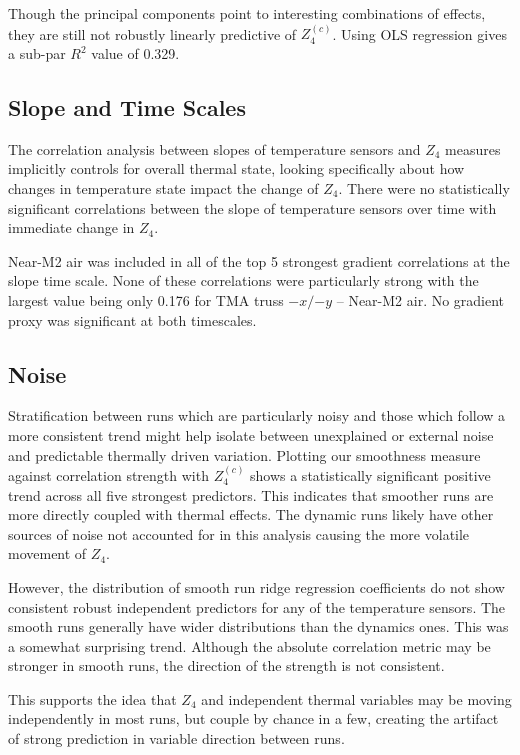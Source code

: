 \documentclass[SE,authoryear,toc]{lsstdoc}
\begin{document}
Though the principal components point to interesting combinations of effects, they are still not robustly linearly predictive of $Z_4^{(c)}$. Using OLS regression gives a sub-par $R^2$ value of 0.329.

\subsection{Slope and Time Scales}

The correlation analysis between slopes of temperature sensors and $Z_4$ measures implicitly controls for overall thermal state, looking specifically about how changes in temperature state impact the change of $Z_4$. There were no statistically significant correlations between the slope of temperature sensors over time with immediate change in $Z_4$.

Near-M2 air was included in all of the top 5 strongest gradient correlations at the slope time scale. None of these correlations were particularly strong with the largest value being only 0.176 for TMA truss $-x/{-y}$ -- Near-M2 air. No gradient proxy was significant at both timescales.

\subsection{Noise}
Stratification between runs which are particularly noisy and those which follow a more consistent trend might help isolate between unexplained or external noise and predictable thermally driven variation. Plotting our smoothness measure against correlation strength with $Z_4^{(c)}$ shows a statistically significant positive trend across all five strongest predictors. This indicates that smoother runs are more directly coupled with thermal effects. The dynamic runs likely have other sources of noise not accounted for in this analysis causing the more volatile movement of $Z_4$.

However, the distribution of smooth run ridge regression coefficients do not show consistent robust independent predictors for any of the temperature sensors. The smooth runs generally have wider distributions than the dynamics ones. This was a somewhat surprising trend. Although the absolute correlation metric may be stronger in smooth runs, the direction of the strength is not consistent.

This supports the idea that $Z_4$ and independent thermal variables may be moving independently in most runs, but couple by chance in a few, creating the artifact of strong prediction in variable direction between runs. 
\end{document}
